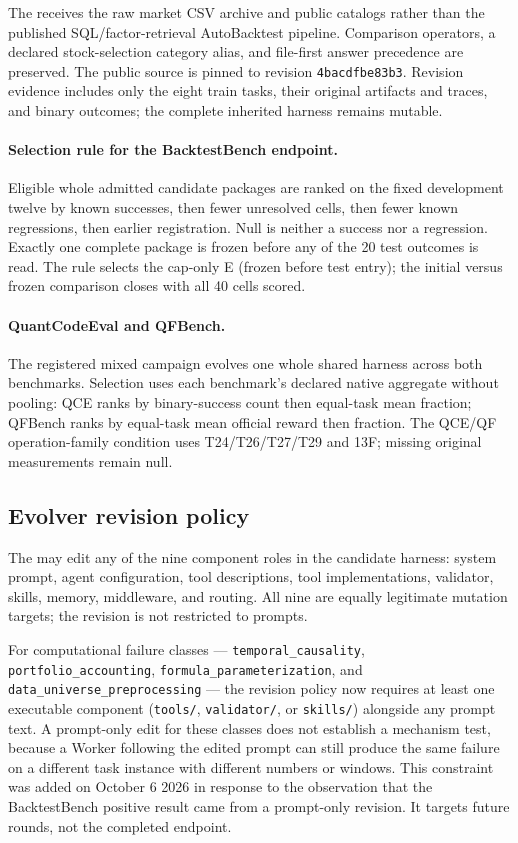 The \Worker{} receives the raw market CSV archive and public catalogs rather
than the published SQL/factor-retrieval AutoBacktest pipeline.  Comparison
operators, a declared stock-selection category alias, and file-first answer
precedence are preserved.  The public source is pinned to revision
\texttt{4bacdfbe83b3}.  Revision evidence includes only the eight train tasks,
their original \Worker{} artifacts and traces, and binary outcomes; the
complete inherited harness remains mutable.

\paragraph{Selection rule for the BacktestBench endpoint.}
Eligible whole admitted candidate packages are ranked on the fixed
development twelve by known successes, then fewer unresolved cells, then
fewer known regressions, then earlier registration.  Null is neither a
success nor a regression.  Exactly one complete package is frozen before
any of the 20 test outcomes is read.  The rule selects the cap-only E
(frozen before test entry); the initial versus frozen comparison closes with
all 40 cells scored.

\paragraph{QuantCodeEval and QFBench.}
The registered mixed campaign evolves one whole shared harness across both
benchmarks.  Selection uses each benchmark's declared native aggregate
without pooling: QCE ranks by binary-success count then equal-task mean
fraction; QFBench ranks by equal-task mean official reward then fraction.
The QCE/QF operation-family condition uses T24/T26/T27/T29 and 13F; missing
original measurements remain null.

\subsection{Evolver revision policy}

The \Evolver{} may edit any of the nine component roles in the candidate
harness: system prompt, agent configuration, tool descriptions, tool
implementations, validator, skills, memory, middleware, and routing.  All
nine are equally legitimate mutation targets; the revision is not restricted
to prompts.

For computational failure classes --- \texttt{temporal\_causality},
\texttt{portfolio\_accounting}, \texttt{formula\_parameterization}, and
\texttt{data\_universe\_preprocessing} --- the revision policy now requires
at least one executable component (\texttt{tools/}, \texttt{validator/}, or
\texttt{skills/}) alongside any prompt text.  A prompt-only edit for these
classes does not establish a mechanism test, because a Worker following the
edited prompt can still produce the same failure on a different task instance
with different numbers or windows.  This constraint was added on October 6
2026 in response to the observation that the BacktestBench positive result
came from a prompt-only revision.  It targets future rounds, not the
completed endpoint.

